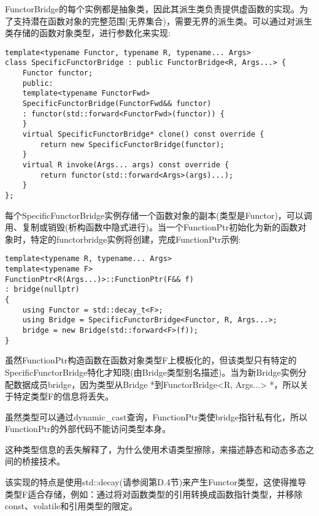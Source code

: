 FunctorBridge的每个实例都是抽象类，因此其派生类负责提供虚函数的实现。为了支持潜在函数对象的完整范围(无界集合)，需要无界的派生类。可以通过对派生类存储的函数对象类型，进行参数化来实现:

\begin{lstlisting}[style=styleCXX]
template<typename Functor, typename R, typename... Args>
class SpecificFunctorBridge : public FunctorBridge<R, Args...> {
	Functor functor;
	public:
	template<typename FunctorFwd>
	SpecificFunctorBridge(FunctorFwd&& functor)
	: functor(std::forward<FunctorFwd>(functor)) {
	}
	virtual SpecificFunctorBridge* clone() const override {
		return new SpecificFunctorBridge(functor);
	}
	virtual R invoke(Args... args) const override {
		return functor(std::forward<Args>(args)...);
	}
};
\end{lstlisting}

每个SpecificFunctorBridge实例存储一个函数对象的副本(类型是Functor)，可以调用、复制或销毁(析构函数中隐式进行)。当一个FunctionPtr初始化为新的函数对象时，特定的functorbridge实例将创建，完成FunctionPtr示例:

\begin{lstlisting}[style=styleCXX]
template<typename R, typename... Args>
template<typename F>
FunctionPtr<R(Args...)>::FunctionPtr(F&& f)
: bridge(nullptr)
{
	using Functor = std::decay_t<F>;
	using Bridge = SpecificFunctorBridge<Functor, R, Args...>;
	bridge = new Bridge(std::forward<F>(f));
}
\end{lstlisting}

虽然FunctionPtr构造函数在函数对象类型F上模板化的，但该类型只有特定的SpecificFunctorBridge特化才知晓(由Bridge类型别名描述)。当为新Bridge实例分配数据成员bridge，因为类型从Bridge *到FunctorBridge<R, Args...> *，所以关于特定类型F的信息将丢失。

\begin{tcolorbox}[colback=webgreen!5!white,colframe=webgreen!75!black]
\hspace*{0.75cm}虽然类型可以通过dynamic\_cast查询，FunctionPtr类使bridge指针私有化，所以FunctionPtr的外部代码不能访问类型本身。
\end{tcolorbox}

这种类型信息的丢失解释了，为什么使用术语类型擦除，来描述静态和动态多态之间的桥接技术。

该实现的特点是使用std::decay(请参阅第D.4节)来产生Functor类型，这使得推导类型F适合存储，例如：通过将对函数类型的引用转换成函数指针类型，并移除const、volatile和引用类型的限定。







































